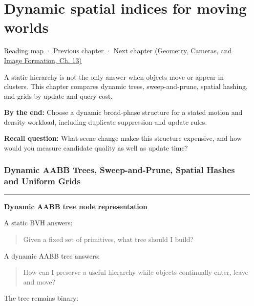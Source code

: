 \chapter{Dynamic spatial indices for moving worlds}\label{06-engine-ii-ch029-dynamic-spatial-indices-for-moving-worlds}\hypertarget{06-engine-ii-ch029}{}\label{stagechapter:06-engine-ii-ch029}

\hyperref[volume-reading-map]{Reading map} · \hyperref[06-engine-ii-ch028-bvh-traversal-refitting-and-simd]{Previous chapter} · \href{../03-Geometry-Cameras-and-Image-Formation/main.pdf\#nameddest=06-engine-ii-ch030-depth-projection-and-shadow-map-precision}{Next chapter (Geometry, Cameras, and Image Formation, Ch. 13)}

A static hierarchy is not the only answer when objects move or appear in clusters. This chapter compares dynamic trees, sweep-and-prune, spatial hashing, and grids by update and query cost.

\textbf{By the end:} Choose a dynamic broad-phase structure for a stated motion and density workload, including duplicate suppression and update rules.

\textbf{Recall question:} What scene change makes this structure expensive, and how would you measure candidate quality as well as update time?

\subsection{Dynamic AABB Trees, Sweep-and-Prune, Spatial Hashes and Uniform Grids}\label{06-engine-ii-ch029-dynamic-aabb-trees-sweep-and-prune-spatial-hashes-and-uniform-grids}

\begin{center}\rule{0.5\linewidth}{0.5pt}\end{center}

\textbf{Dynamic AABB tree node representation}

A static BVH answers:

\begin{quote}
Given a fixed set of primitives, what tree should I build?
\end{quote}

A dynamic AABB tree answers:

\begin{quote}
How can I preserve a useful hierarchy while objects continually enter, leave and move?
\end{quote}

The tree remains binary:

